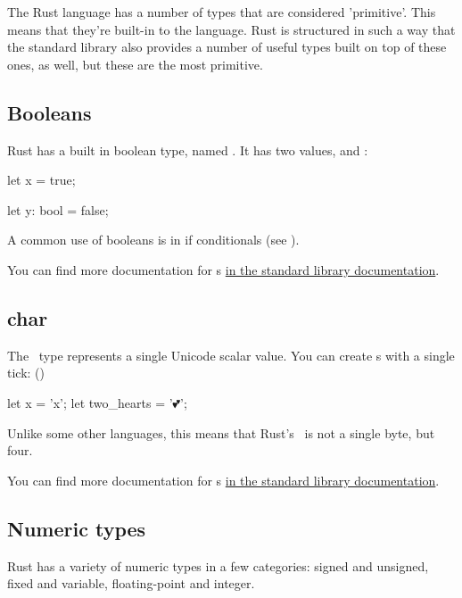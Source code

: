 The Rust language has a number of types that are considered 'primitive'. This means that they're built-in to the language. Rust is
structured in such a way that the standard library also provides a number of useful types built on top of these ones, as well, but 
these are the most primitive.

\subsection*{Booleans}

Rust has a built in boolean type, named . It has two values,  and :

\begin{rustc}
let x = true;

let y: bool = false;
\end{rustc}

A common use of booleans is in if conditionals (see ).

\blank

You can find more documentation for s \href{https://doc.rust-lang.org/std/primitive.bool.html}{in the standard library
documentation}.

\subsection*{char}

The \varchar\ type represents a single Unicode scalar value. You can create \varchar s with a single tick: ()

\begin{rustc}
let x = 'x';
let two_hearts = '💕';
\end{rustc}

Unlike some other languages, this means that Rust's \varchar\ is not a single byte, but four.

\blank

You can find more documentation for \varchar s \href{https://doc.rust-lang.org/std/primitive.char.html}{in the standard library
documentation}.

\subsection*{Numeric types}

Rust has a variety of numeric types in a few categories: signed and unsigned, fixed and variable, floating-point and integer.

